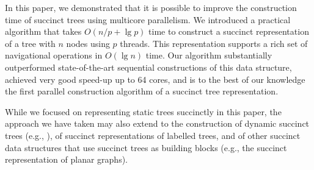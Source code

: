 In this paper, we demonstrated that it is possible to improve the construction
time of succinct trees using multicore parallelism.
We introduced a practical algorithm that takes $O(n/p+\lg p)$ time to construct
a succinct representation of a tree with $n$ nodes using $p$ threads.
This representation supports a rich set of navigational operations in $O(\lg n)$
time.
Our algorithm substantially outperformed state-of-the-art sequential
constructions of this data structure, achieved very good speed-up up to 64
cores, and is to the best of our knowledge the first parallel construction
algorithm of a succinct tree representation.

While we focused on representing static trees succinctly in this paper, the
approach we have taken may also extend to the construction of dynamic succinct
trees (e.g., \cite{Navarro:2014:FFS:2620785.2601073}), of succinct
representations of labelled trees, and of other succinct data structures that
use succinct trees as building blocks (e.g., the succinct representation of
planar graphs).
